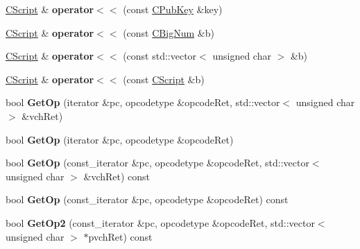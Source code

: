 \begin{DoxyCompactItemize}
\item 
\mbox{\label{class_c_script_a90ca62e4cd7e8c6e90a397f42d6b0564}} 
\mbox{\hyperlink{class_c_script}{C\+Script}} \& {\bfseries operator$<$$<$} (const \mbox{\hyperlink{class_c_pub_key}{C\+Pub\+Key}} \&key)
\item 
\mbox{\label{class_c_script_a05fc4f7c67388701e4af16e8c1d66727}} 
\mbox{\hyperlink{class_c_script}{C\+Script}} \& {\bfseries operator$<$$<$} (const \mbox{\hyperlink{class_c_big_num}{C\+Big\+Num}} \&b)
\item 
\mbox{\label{class_c_script_a6e58790e9f280dd7272ca0d81459b6ef}} 
\mbox{\hyperlink{class_c_script}{C\+Script}} \& {\bfseries operator$<$$<$} (const std\+::vector$<$ unsigned char $>$ \&b)
\item 
\mbox{\label{class_c_script_aa47d739da94465950b3977c04a49f089}} 
\mbox{\hyperlink{class_c_script}{C\+Script}} \& {\bfseries operator$<$$<$} (const \mbox{\hyperlink{class_c_script}{C\+Script}} \&b)
\item 
\mbox{\label{class_c_script_a94635ed93d8d244ec3acfa83f9ecfe5f}} 
bool {\bfseries Get\+Op} (iterator \&pc, opcodetype \&opcode\+Ret, std\+::vector$<$ unsigned char $>$ \&vch\+Ret)
\item 
\mbox{\label{class_c_script_a913b6f84ecb7ae584200279fa0c064a9}} 
bool {\bfseries Get\+Op} (iterator \&pc, opcodetype \&opcode\+Ret)
\item 
\mbox{\label{class_c_script_ae07231780831ba57f723bd35e4572753}} 
bool {\bfseries Get\+Op} (const\+\_\+iterator \&pc, opcodetype \&opcode\+Ret, std\+::vector$<$ unsigned char $>$ \&vch\+Ret) const
\item 
\mbox{\label{class_c_script_aa292083a7d467b4991fd650fa42e333d}} 
bool {\bfseries Get\+Op} (const\+\_\+iterator \&pc, opcodetype \&opcode\+Ret) const
\item 
\mbox{\label{class_c_script_aac2dbe75742054049b0c6de0e9473ef0}} 
bool {\bfseries Get\+Op2} (const\+\_\+iterator \&pc, opcodetype \&opcode\+Ret, std\+::vector$<$ unsigned char $>$ $\ast$pvch\+Ret) const

\end{DoxyCompactItemize}
